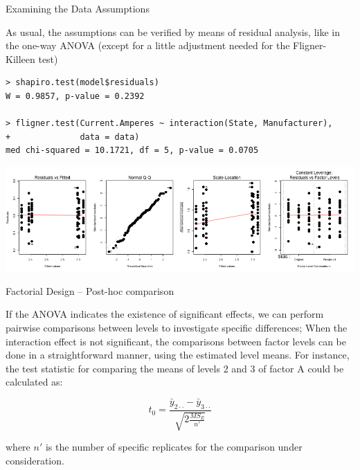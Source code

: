 \begin{frame}[fragile]{Examining the Data Assumptions}

As usual, the assumptions can be verified by means of residual analysis, like in the one-way ANOVA (except for a little adjustment needed for the Fligner-Killeen test)

{\smaller
\begin{verbatim}
> shapiro.test(model$residuals)
W = 0.9857, p-value = 0.2392

> fligner.test(Current.Amperes ~ interaction(State, Manufacturer),
+              data = data)
med chi-squared = 10.1721, df = 5, p-value = 0.0705
\end{verbatim}}

\includegraphics[width=.8\textwidth]{../img/motors_res.png}
\end{frame}

\begin{frame}{Factorial Design -- Post-hoc comparison}

If the ANOVA indicates the existence of significant effects, we can perform pairwise comparisons between levels to investigate specific differences;
\bigskip
When the interaction effect is not significant, the comparisons between factor levels can be done in a straightforward manner, using the estimated level means. For instance, the test statistic for comparing the means of levels 2 and 3 of factor A could be calculated as:

\begin{equation*}
t_0 = \frac{\bar{y}_{2\cdot\cdot} - \bar{y}_{3\cdot\cdot}}{\sqrt{2\frac{MS_E}{n'}}}
\end{equation*}

where $n'$ is the number of specific replicates for the comparison under consideration.
\end{frame}

